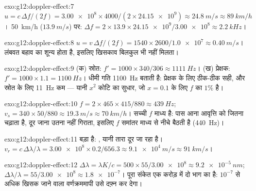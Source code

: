 \begin{solution}{exo:g12:doppler-effect:7}
$u = c\,\Delta f/(2f) = \num{3.00e8} \times 4000/(2 \times \num{24.15e9}) \approx
\qty{24.8}{m/s} \approx \qty{89}{km/h}$। \qty{50}{km/h} ($\qty{13.9}{m/s}$) पर: $\Delta f = 2 \times 13.9 \times \num{24.15e9}/\num{3.00e8} \approx \qty{2.2}{kHz}$।
\end{solution}

\begin{solution}{exo:g12:doppler-effect:8}
$u = v\,\Delta f/(2f) = 1540 \times 2600/\num{1.0e7} \approx \qty{0.40}{m/s}$। लंबवत बहाव का  शून्य होता है, इसलिए खिसकाव बिलकुल
भी नहीं मिलता।
\end{solution}

\begin{solution}{exo:g12:doppler-effect:9}
(क) स्रोत: $f' = 1000 \times 340/306 \approx \qty{1111}{Hz}$। (ख) प्रेक्षक: $f' = 1000 \times 1.1 = \qty{1100}{Hz}$। धीमी गति \qty{1100}{Hz} बताती है: प्रेक्षक
के लिए ठीक-ठीक सही, और स्रोत के लिए \qty{11}{Hz} कम --- यानी $x^2$ कोटि का सुधार,
जो $x = 0.1$ के लिए $f$ का $1\%$ है।
\end{solution}

\begin{solution}{exo:g12:doppler-effect:10}
$f = 2 \times 465 \times 415/880 \approx \qty{439}{Hz}$; $v_s = 340 \times 50/880 \approx \qty{19.3}{m/s} \approx \qty{70}{km/h}$। सच्ची $f$  माध्य है: पास आना
आवृत्ति को जितना चढ़ाता है, दूर जाना उतना नहीं गिराता, इसलिए $f$
समांतर माध्य से नीचे बैठती है (\qty{440}{Hz})।
\end{solution}

\begin{solution}{exo:g12:doppler-effect:11}
 बड़ा है: , यानी तारा दूर जा रहा है।
$v_r = c\,\Delta\lambda/\lambda =
\num{3.00e8} \times 0.2/656.3 \approx \qty{9.1e4}{m/s} \approx \qty{91}{km/s}$।
\end{solution}

\begin{solution}{exo:g12:doppler-effect:12}
$\Delta\lambda = \lambda K/c = 500 \times 55/\num{3.00e8} \approx \qty{9.2e-5}{nm}$; $\Delta\lambda/\lambda = 55/\num{3.00e8} \approx \num{1.8e-7}$। पूरा संकेत एक करोड़ में दो भाग का है: $10^{-7}$ से अधिक
खिसक जाने वाला वर्णक्रममापी उसे दफ़्न कर देगा।
\end{solution}

